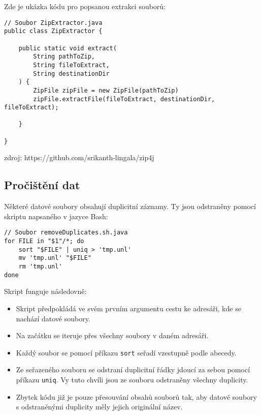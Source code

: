 \noindent Zde je ukázka kódu pro popsanou extrakci souborů:

\begin{lstlisting}[caption={Ukázka extrakce souborů ze zipu}, label={lst:zip4j}, tabsize=2]
// Soubor ZipExtractor.java
public class ZipExtractor {

	public static void extract(
		String pathToZip, 
		String fileToExtract, 
		String destinationDir
	) {
		ZipFile zipFile = new ZipFile(pathToZip)
		zipFile.extractFile(fileToExtract, destinationDir, fileToExtract);
		
	}
		
}
\end{lstlisting}

zdroj: https://github.com/srikanth-lingala/zip4j

\subsection{Pročištění dat}
Některé datové soubory obsahují duplicitní záznamy. Ty jsou odstraněny pomocí skriptu napsaného v jazyce Bash:

\begin{lstlisting}[caption={Skript pro odstranění duplicitních řádků}, tabsize=2]
// Soubor removeDuplicates.sh.java
for FILE in "$1"/*; do
	sort "$FILE" | uniq > 'tmp.unl'
	mv 'tmp.unl' "$FILE"
	rm 'tmp.unl'
done
\end{lstlisting}

\noindent Skript funguje následovně:

\begin{itemize}
	\item Skript předpokládá ve svém prvním argumentu cestu ke adresáři, kde se nachází datové soubory.
	
	\item Na začátku se iteruje přes všechny soubory v daném adresáři.
	
	\item Každý soubor se pomocí příkazu \lstinline|sort| seřadí vzestupně podle abecedy.
	
	\item Ze seřazeného souboru se odstraní duplicitní řádky jdoucí za sebou pomocí příkazu \lstinline|uniq|. Vy tuto chvíli jsou ze souboru odstraněny všechny duplicity.
	
	\item Zbytek kódu již je pouze přesouvání obsahů souborů tak, aby datové soubory s odstraněnými duplicity měly jejich originální název.
\end{itemize}

